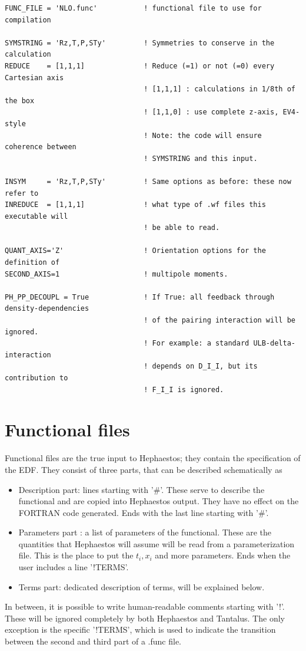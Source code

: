 \documentclass[print,amsmath,amssymb,aps,prc,nofootinbib,notitlepage]{revtex4-1}
\begin{document}
\begin{Verbatim}
FUNC_FILE = 'NLO.func'           ! functional file to use for compilation

SYMSTRING = 'Rz,T,P,STy'         ! Symmetries to conserve in the calculation 
REDUCE    = [1,1,1]              ! Reduce (=1) or not (=0) every Cartesian axis
                                 ! [1,1,1] : calculations in 1/8th of the box
                                 ! [1,1,0] : use complete z-axis, EV4-style
                                 ! Note: the code will ensure coherence between
                                 ! SYMSTRING and this input.

INSYM     = 'Rz,T,P,STy'         ! Same options as before: these now refer to 
INREDUCE  = [1,1,1]              ! what type of .wf files this executable will
                                 ! be able to read. 
                                 
QUANT_AXIS='Z'                   ! Orientation options for the definition of
SECOND_AXIS=1                    ! multipole moments.

PH_PP_DECOUPL = True             ! If True: all feedback through density-dependencies
                                 ! of the pairing interaction will be ignored. 
                                 ! For example: a standard ULB-delta-interaction
                                 ! depends on D_I_I, but its contribution to 
                                 ! F_I_I is ignored. 
\end{Verbatim}


\clearpage
\section{Functional files}

Functional files are the true input to Hephaestos; they contain the specification of 
the EDF. They consist of three parts, that can be described schematically as
%
\begin{itemize}
\item Description part: lines starting with '\#'. These serve to describe the 
      functional and are copied into Hephaestos output. They have no effect
      on the FORTRAN code generated. Ends with the last line starting with 
      '\#'.
\item Parameters part : a list of parameters of the functional. These are the 
      quantities that Hephaestos will assume will be read from a parameterization
      file. This is the place to put the $t_i, x_i$ and more parameters.
      Ends when the user includes a line '!TERMS'.
\item Terms part: dedicated description of terms, will be explained below.
\end{itemize}
%
In between, it is possible to write human-readable comments starting with '!'. 
These will be ignored completely by both Hephaestos and Tantalus. The only 
exception is the specific '!TERMS', which is used to indicate the transition 
between the second and third part of a .func file. 
\end{document}
